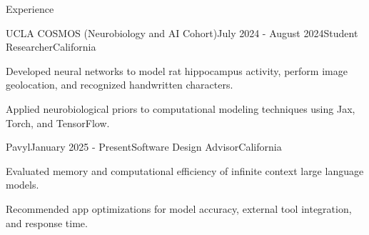 \documentclass[
  10pt, %
]{resume}
\begin{document}
\begin{rSection}{Experience}
  \begin{rSubsection}{UCLA COSMOS (Neurobiology and AI Cohort)}{July 2024 - August 2024}{Student Researcher}{California}
    
    \item Developed neural networks to model rat hippocampus activity, perform image geolocation, and recognized handwritten characters.
    
    \item Applied neurobiological priors to computational modeling techniques using Jax, Torch, and TensorFlow.
    
  \end{rSubsection}
        
  \begin{rSubsection}{Pavyl}{January 2025 - Present}{Software Design Advisor}{California}
    
    \item Evaluated memory and computational efficiency of infinite context large language models.
    
    \item Recommended app optimizations for model accuracy, external tool integration, and response time.
    
  \end{rSubsection}
        
	
\end{rSection}

\end{document}

